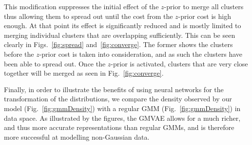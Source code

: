\documentclass{article} \usepackage{iclr2017_conference,times}
\begin{document}
This modification suppresses the initial effect of the $z$-prior to merge all clusters thus allowing them to spread out until the cost from the $z$-prior cost is high enough. At that point its effect is significantly reduced and is mostly limited to merging individual clusters that are overlapping sufficiently. This can be seen clearly in Figs.~\ref{fig:spread} and~\ref{fig:converge}. The former shows the clusters before the $z$-prior cost is taken into consideration, and as such the clusters have been able to spread out. Once the $z$-prior is activated, clusters that are very close together will be merged as seen in Fig.~\ref{fig:converge}. 


Finally, in order to illustrate the benefits of using neural networks for the transformation of the distributions, we compare the density observed by our model (Fig.~\ref{fig:gmmDensity}) with a regular GMM (Fig.~\ref{fig:gmmDensity}) in data space. As illustrated by the figures, the GMVAE allows for a much richer, and thus more accurate representations than regular GMMs, and is therefore more successful at modelling non-Gaussian data. 
\end{document}
